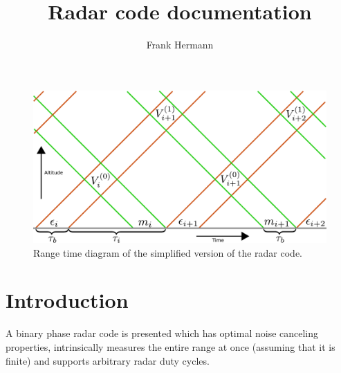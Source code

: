 \documentclass[18pt,a4paper]{extarticle}
\author{Frank Hermann}
\title{Radar code documentation}
\begin{document}
\maketitle
\begin{figure}
	\centering
	\includegraphics[width=1\linewidth]{code_diagram.pdf}
	\caption{Range time diagram of the simplified version of the radar code.}
	\label{fig:sketch}
\end{figure}

\section{Introduction}
A binary phase radar code is presented which has optimal noise canceling properties, intrinsically measures the entire range at once (assuming that it is finite) and supports arbitrary radar duty cycles.
\end{document}
